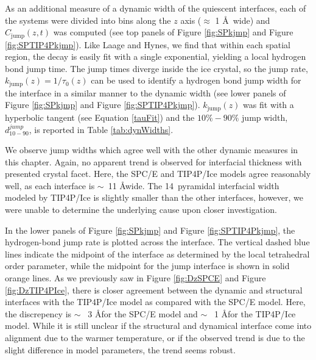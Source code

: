 As an additional measure of a dynamic width of the quiescent
interfaces, each of the systems were divided into bins along the $z$
axis ($\approx$ 1 \AA\ wide) and $C_\mathrm{jump}(z,t)$ was computed
(see top panels of Figure \ref{fig:SPkjmp} and Figure
\ref{fig:SPTIP4Pkjmp}).  Like Laage and Hynes, we find that within
each spatial region, the decay is easily fit with a single
exponential, yielding a local hydrogen bond jump time. The jump times
diverge inside the ice crystal, so the jump rate,
$k_\mathrm{jump}(z) = 1 / \tau_0(z)$ can be used to identify a
hydrogen bond jump width for the interface in a similar manner to the
dynamic width (see lower panels of Figure \ref{fig:SPkjmp} and Figure
\ref{fig:SPTIP4Pkjmp}). $k_\mathrm{jump}(z)$ was fit with a hyperbolic
tangent (see Equation \eqref{tauFit}) and the $10\%-90\%$ jump width,
$d_\mathrm{10-90}^{jump}$, is reported in Table \ref{tab:dynWidths}.

We observe jump widths which agree well with the other dynamic
measures in this chapter. Again, no apparent trend is observed for
interfacial thickness with presented crystal facet. Here, the SPC/E
and TIP4P/Ice models agree reasonably well, as each interface is
$\sim$~11 \AA wide. The 14\degree~pyramidal interfacial width modeled
by TIP4P/Ice is slightly smaller than the other interfaces, however,
we were unable to determine the underlying cause upon closer
investigation.

In the lower panels of Figure \ref{fig:SPkjmp} and Figure
\ref{fig:SPTIP4Pkjmp}, the hydrogen-bond jump rate is plotted across
the interface. The vertical dashed blue lines indicate the midpoint of
the interface as determined by the local tetrahedral order parameter,
while the midpoint for the jump interface is shown in solid orange
lines. As we previously saw in Figure \ref{fig:DzSPCE} and Figure
\ref{fig:DzTIP4PIce}, there is closer agreement between the dynamic
and structural interfaces with the TIP4P/Ice model as compared with
the SPC/E model. Here, the discrepency is $\sim$~ 3 \AA for the SPC/E
model and $\sim$~ 1 \AA for the TIP4P/Ice model. While it is still unclear
if the structural and dynamical interface come into alignment due to
the warmer temperature, or if the observed trend is due to the slight
difference in model parameters, the trend seems robust.  

